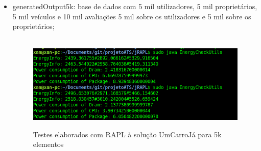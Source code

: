 \begin{itemize}
    \item generatedOutput5k: base de dados com 5 mil utilizadores, 5 mil proprietários, 5 mil veículos e 10 mil avaliações 5 mil sobre os utilizadores e 5 mil sobre os proprietários;\newline
    
        \begin{figure}[H]
            \hbox{\hspace{-8em} \includegraphics[width=1.4\textwidth]{images/rapl_5k_v1.png}}
            \label{fig52}
            \caption{Testes elaborados com RAPL à solução UmCarroJá para 5k elementos}
        \end{figure}
\end{itemize}
\newpage
